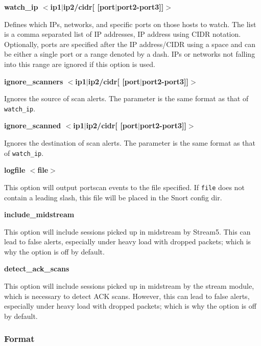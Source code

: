 \documentclass[english]{report}
\newcounter{slistnum}
\newenvironment{slist}
{ \begin{list}{ {\bf \arabic{slistnum}.} }{\usecounter{slistnum} } }
{ \end{list} }
\begin{document}
\begin{slist}
\begin{itemize}
\end{itemize}

\item \textbf{watch\_ip $<$ip1$|$ip2/cidr[ [port$|$port2-port3]]$>$ }

Defines which IPs, networks, and specific ports on those hosts to watch.  The
list is a comma separated list of IP addresses, IP address using CIDR notation.
Optionally, ports are specified after the IP address/CIDR using a space and can
be either a single port or a range denoted by a dash.  IPs or networks not
falling into this range are ignored if this option is used.

\item \textbf{ignore\_scanners $<$ip1$|$ip2/cidr[ [port$|$port2-port3]]$>$ }

Ignores the source of scan alerts.  The parameter is the same format as that of
\texttt{watch\_ip}.

\item \textbf{ignore\_scanned $<$ip1$|$ip2/cidr[ [port$|$port2-port3]]$>$ }

Ignores the destination of scan alerts.  The parameter is the same format as
that of \texttt{watch\_ip}.

\item \textbf{logfile $<$file$>$ } 

This option will output portscan events to the file specified. If \texttt{file}
does not contain a leading slash, this file will be placed in the Snort config
dir.

\item \textbf{include\_midstream}

This option will include sessions picked up in midstream by Stream5.
This can lead to false alerts, especially under heavy load with dropped
packets; which is why the option is off by default.

\item \textbf{detect\_ack\_scans}

This option will include sessions picked up in midstream by the stream module,
which is necessary to detect ACK scans.  However, this can lead to false
alerts, especially under heavy load with dropped packets; which is why the
option is off by default.

\end{slist}

\subsubsection{Format}
\end{document}
